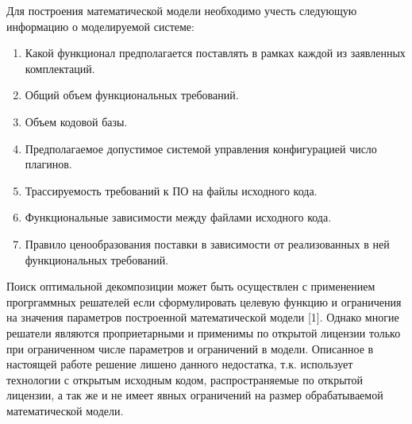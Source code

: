 Для построения математической модели необходимо учесть следующую информацию о моделируемой системе:
\begin{enumerate}
    \item Какой функционал предполагается поставлять в рамках каждой из заявленных комплектаций.
    \item Общий объем функциональных требований.
    \item Объем кодовой базы.
    \item Предполагаемое допустимое системой управления конфигурацией число плагинов.
    \item Трассируемость требований к ПО на файлы исходного кода.
    \item Функциональные зависимости между файлами исходного кода.
    \item Правило ценообразования поставки в зависимости от реализованных в ней функциональных требований.
\end{enumerate}



Поиск оптимальной декомпозиции может быть осуществлен с применением прогргаммных решателей если сформулировать целевую функцию и ограничения на значения параметров построенной математической модели [1]. Однако многие решатели являются проприетарными и применимы по открытой лицензии только при ограниченном числе параметров и ограничений в модели. Описанное в настоящей работе решение лишено данного недостатка, т.к. использует технологии с открытым исходным кодом, распространяемые по открытой лицензии, а так же и не имеет явных ограничений на размер обрабатываемой математической модели.

